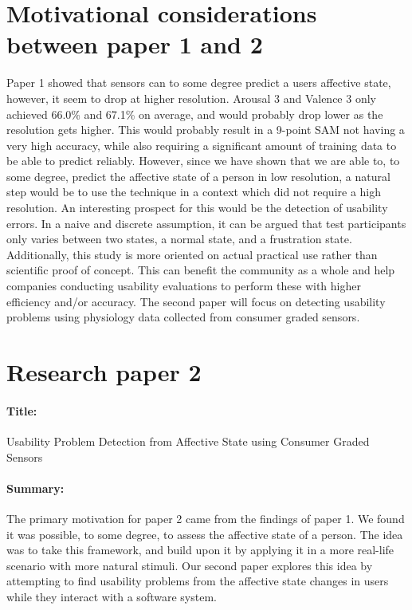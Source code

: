 \section{Motivational considerations between paper 1 and 2}
Paper 1 showed that sensors can to some degree predict a users affective state, however, it seem to drop at higher resolution. 
Arousal 3 and Valence 3 only achieved 66.0\% and 67.1\% on average, and would probably drop lower as the resolution gets higher. 
This would probably result in a 9-point SAM not having a very high accuracy, while also requiring a significant amount of training data to be able to predict reliably.
However, since we have shown that we are able to, to some degree, predict the affective state of a person in low resolution, a natural step would be to use the technique in a context which did not require a high resolution. 
An interesting prospect for this would be the detection of usability errors.
In a naive and discrete assumption, it can be argued that test participants only varies between two states, a normal state, and a frustration state.
Additionally, this study is more oriented on actual practical use rather than scientific proof of concept. 
This can benefit the community as a whole and help companies conducting usability evaluations to perform these with higher efficiency and/or accuracy.
The second paper will focus on detecting usability problems using physiology data collected from consumer graded sensors.

\section{Research paper 2}
\paragraph{Title:}
Usability Problem Detection from Affective State using Consumer Graded Sensors
\paragraph{Summary:}
The primary motivation for paper 2 came from the findings of paper 1. 
We found it was possible, to some degree, to assess the affective state of a person.
The idea was to take this framework, and build upon it by applying it in a more real-life scenario with more natural stimuli.
Our second paper explores this idea by attempting to find usability problems from the affective state changes in users
while they interact with a software system.

